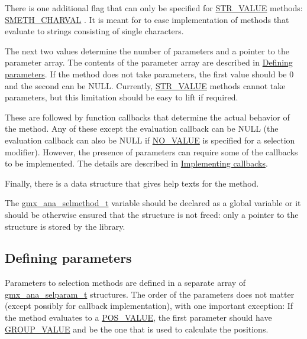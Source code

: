 \-There is one additional flag that can only be specified for \hyperlink{share_2template_2gromacs_2selvalue_8h_a70b42b87d434580bf1493591857b8beca6f2f1fe9592d96990c9ac690c355bd08}{\-S\-T\-R\-\_\-\-V\-A\-L\-U\-E} methods\-: \hyperlink{share_2template_2gromacs_2selmethod_8h_a78abdcb637f45eafa513d07aaf14a45e}{\-S\-M\-E\-T\-H\-\_\-\-C\-H\-A\-R\-V\-A\-L} . \-It is meant for to ease implementation of methods that evaluate to strings consisting of single characters.

\-The next two values determine the number of parameters and a pointer to the parameter array. \-The contents of the parameter array are described in \hyperlink{selmethods_selmethods_params}{\-Defining parameters}. \-If the method does not take parameters, the first value should be 0 and the second can be \-N\-U\-L\-L. \-Currently, \hyperlink{share_2template_2gromacs_2selvalue_8h_a70b42b87d434580bf1493591857b8beca6f2f1fe9592d96990c9ac690c355bd08}{\-S\-T\-R\-\_\-\-V\-A\-L\-U\-E} methods cannot take parameters, but this limitation should be easy to lift if required.

\-These are followed by function callbacks that determine the actual behavior of the method. \-Any of these except the evaluation callback can be \-N\-U\-L\-L (the evaluation callback can also be \-N\-U\-L\-L if \hyperlink{share_2template_2gromacs_2selvalue_8h_a70b42b87d434580bf1493591857b8beca4d694119ce83b62d74ff06b5e017dca8}{\-N\-O\-\_\-\-V\-A\-L\-U\-E} is specified for a selection modifier). \-However, the presence of parameters can require some of the callbacks to be implemented. \-The details are described in \hyperlink{selmethods_selmethods_callbacks}{\-Implementing callbacks}.

\-Finally, there is a data structure that gives help texts for the method.

\-The {\ttfamily \hyperlink{structgmx__ana__selmethod__t}{gmx\-\_\-ana\-\_\-selmethod\-\_\-t}} variable should be declared as a global variable or it should be otherwise ensured that the structure is not freed\-: only a pointer to the structure is stored by the library.\hypertarget{selmethods_selmethods_params}{}\subsection{\-Defining parameters}\label{selmethods_selmethods_params}
\-Parameters to selection methods are defined in a separate array of {\ttfamily \hyperlink{structgmx__ana__selparam__t}{gmx\-\_\-ana\-\_\-selparam\-\_\-t}} structures. \-The order of the parameters does not matter (except possibly for callback implementation), with one important exception\-: \-If the method evaluates to a \hyperlink{share_2template_2gromacs_2selvalue_8h_a70b42b87d434580bf1493591857b8beca31a47fbfbc85ad1472ce3d2a168fd1ec}{\-P\-O\-S\-\_\-\-V\-A\-L\-U\-E}, the first parameter should have \hyperlink{share_2template_2gromacs_2selvalue_8h_a70b42b87d434580bf1493591857b8beca70a2af6eafa48adfab506ceee60471f6}{\-G\-R\-O\-U\-P\-\_\-\-V\-A\-L\-U\-E} and be the one that is used to calculate the positions.

